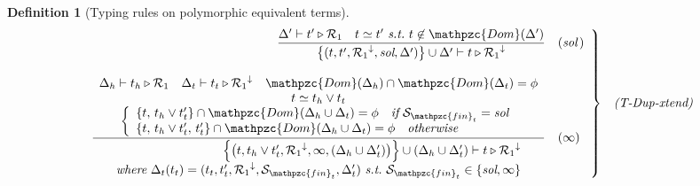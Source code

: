 \documentclass[12pt]{article}
\newtheorem{Definition}{Definition}[section]
\begin{document}
\begin{Definition}[Typing rules on polymorphic equivalent terms]
\begin{displaymath}
\begin{array}{c}
      \begin{array}{rl}
        \left. \begin{array}{rl}
          \dfrac{
            \Delta' \vdash t' \triangleright \mathcal{R}_1 \quad
             t \simeq t'\ \text{\it s.t.}\ t \not\in \mathpzc{Dom}(\Delta')
          }{
            \bigl\{(t, t', {\mathcal{R}_1}^\downarrow, \text{\it sol},
             \Delta') \bigr\} \cup \Delta' \vdash
              t \triangleright {\mathcal{R}_1}^\downarrow
          }  &  (\text{\it sol}\,)  \\
          \\
          
          \dfrac{
            \begin{array}{c}
              \Delta_h \vdash t_h \triangleright \mathcal{R}_1
               \quad \Delta_t \vdash t_t \triangleright
                {\mathcal{R}_1}^\downarrow
                 \quad \mathpzc{Dom}(\Delta_h) \cap \mathpzc{Dom}(\Delta_t)
                  = \phi  \\
              t \simeq t_h \vee t_t  \\
              \left\{\begin{array}{l}
                \{t,\, t_h \vee t'_t \} \cap \mathpzc{Dom}(
                 \Delta_h \cup \Delta_t) = \phi\quad \text{\it if}\
                  \mathcal{S}_{\mathpzc{fin}_t} = \text{\it sol}  \\
                \{t,\, t_h \vee t'_t,\, t'_t \} \cap \mathpzc{Dom}(
                 \Delta_h \cup \Delta_t) = \phi\quad \text{\it otherwise}
              \end{array}\right.
            \end{array}
          }{
            \begin{array}{r}
              \Bigl\{\bigl(t, t_h \vee t_t', {\mathcal{R}_1}^\downarrow,
               \infty, (\Delta_h \cup \Delta_t') \bigr) \Bigr\} \cup
                (\Delta_h \cup \Delta_t') \vdash
                 t \triangleright {\mathcal{R}_1}^\downarrow  \\
              \text{\it where}\
               \Delta_t(t_t) = (t_t, t_t', {\mathcal{R}_1}^\downarrow,
                \mathcal{S}_{\mathpzc{fin}_t}, \Delta_t')\ \text{\it s.t.}\
                 \mathcal{S}_{\mathpzc{fin}_t} \in \{\text{\it sol}, \infty\}
            \end{array}
          }  &  (\infty)
        \end{array} \right\}  &  \text{\it (T-Dup-xtend)}
      \end{array}  \\
      \\
      

\end{array}
\end{displaymath}
\end{Definition}
\end{document}
